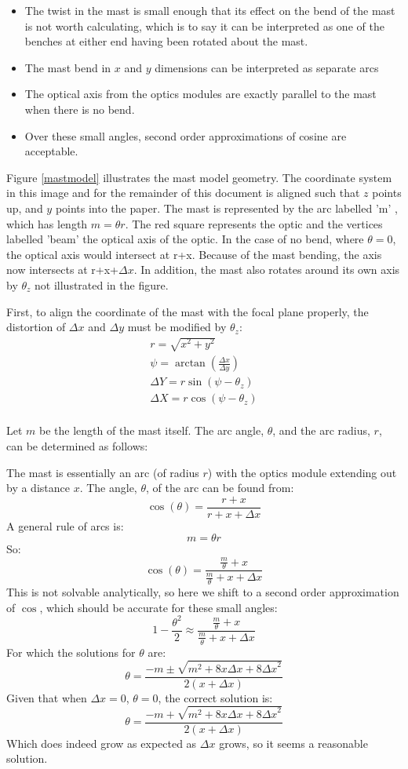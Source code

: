 \begin{itemize}
    \item The twist in the mast is small enough that its effect on the bend of the mast is not worth calculating, which is to say it can be interpreted as one of the benches at either end having been rotated about the mast.
    \item The mast bend in $x$ and $y$ dimensions can be interpreted as separate arcs 
    \item The optical axis from the optics modules are exactly parallel to the mast when there is no bend.
    \item Over these small angles, second order approximations of cosine are acceptable. 
\end{itemize}

Figure \ref{mastmodel} illustrates the mast model geometry. The coordinate system in this image and for the remainder of this document is aligned such that $z$ points up, and $y$ points into the paper. The mast is represented by the arc labelled 'm' , which has length $m= \theta r$. The red square represents the optic and the vertices labelled 'beam' the optical axis of the optic. In the case of no bend, where $\theta=0$, the optical axis would intersect at r+x. Because of the mast bending, the axis now intersects at r+x+$\Delta x$. In addition, the mast also rotates around its own axis by $\theta_z$ not illustrated in the figure.

First, to align the coordinate of the mast with the focal plane properly, the distortion of $\Delta x$ and $\Delta y$ must be modified by $\theta_z$:
\begin{eqnarray}
r = \sqrt{x^2+y^2}\\
\psi = \arctan \left(\frac{\Delta x}{\Delta y}\right)\\
\Delta Y = r \sin (\psi-\theta_z)\\
\Delta X = r \cos (\psi-\theta_z)\\
\end{eqnarray}

Let $m$ be the length of the mast itself. The arc angle, $\theta$, and the arc radius, $r$, can be determined as follows:

The mast is essentially an arc (of radius $r$) with the optics module extending out by a distance $x$. The angle, $\theta$, of the arc can be found from:
\[
\cos \left( \theta \right) = \frac{r+x}{r+x+\Delta x}
\]
A general rule of arcs is:
\[
m = \theta r
\]
So:
\[
\cos \left( \theta \right) = \frac{\frac{m}{\theta}+x}{\frac{m}{\theta}+x+\Delta x}
\]
This is not solvable analytically, so here we shift to a second order approximation of $\cos$, which should be accurate for these small angles:
\[
1-\frac{\theta^2}{2} \approx \frac{\frac{m}{\theta}+x}{\frac{m}{\theta}+x+\Delta x}
\]
For which the solutions for $\theta$ are:
\[
\theta = \frac{-m \pm \sqrt{m^2+8x\Delta x + 8{\Delta x}^2}}{2 \left( x + \Delta x \right)}
\]
Given that when $\Delta x = 0$, $\theta = 0$, the correct solution is:
\[
\theta = \frac{-m + \sqrt{m^2+8x\Delta x + 8{\Delta x}^2}}{2 \left( x + \Delta x \right)}
\]
Which does indeed grow as expected as $\Delta x$ grows, so it seems a reasonable solution. 


